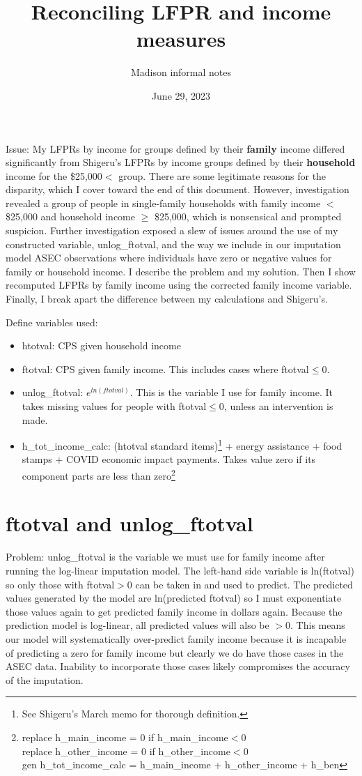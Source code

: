 \documentclass{article}
\title{Reconciling LFPR and income measures}
\author{Madison informal notes}
\date{June 29, 2023}
\begin{document}
 
	\maketitle
	
	Issue: My LFPRs by income for groups defined by their \textbf{family} income differed significantly from Shigeru's LFPRs by income  groups defined by their \textbf{household} income for the \$25,000$<$ group. There are some legitimate reasons for the disparity, which I cover toward the end of this document. However, investigation revealed a group of people in single-family households with family income $<$ \$25,000 and household income $\ge$ \$25,000, which is nonsensical and prompted suspicion. Further investigation exposed a slew of issues around the use of my constructed variable, unlog\_ftotval, and the way we include in our imputation model ASEC observations where individuals have zero or negative values for family or household income. I describe the problem and my solution. Then I show recomputed LFPRs by family income using the corrected family income variable. Finally, I break apart the difference between my calculations and Shigeru's. 
	
	Define variables used:
	\begin{itemize}
		\item htotval: CPS given household income
		\item ftotval: CPS given family income. This includes cases where ftotval$\le$0.
		\item unlog\_ftotval: $e^{ln(ftotval)}$. This is the variable I use for family income. It takes missing values for people with ftotval$\le$0, unless an intervention is made.
		\item h\_tot\_income\_calc:  (htotval standard items)\footnote{See Shigeru's March memo for thorough definition.} + energy assistance + food stamps + COVID economic impact payments. Takes value zero if its component parts are less than zero\footnote{replace h\_main\_income = 0  if  h\_main\_income$<$0 \\
			replace h\_other\_income = 0 if  h\_other\_income$<$0 \\ 
			gen h\_tot\_income\_calc = h\_main\_income +  h\_other\_income + h\_ben}
	\end{itemize}

	\section{ftotval and unlog\_ftotval}
	 Problem: unlog\_ftotval is the variable we must use for family income after running the log-linear imputation model. The left-hand side variable is ln(ftotval) so only those with ftotval$>$0 can be taken in and used to predict. The predicted values generated by the model are ln(predicted ftotval) so I must exponentiate those values again to get predicted family income in dollars again. Because the prediction model is log-linear, all predicted values will also be $>$0. This means our model will systematically over-predict family income because it is incapable of predicting a zero for family income but clearly we do have those cases in the ASEC data. Inability to incorporate those cases likely compromises the accuracy of the imputation. 
	 
\end{document}
